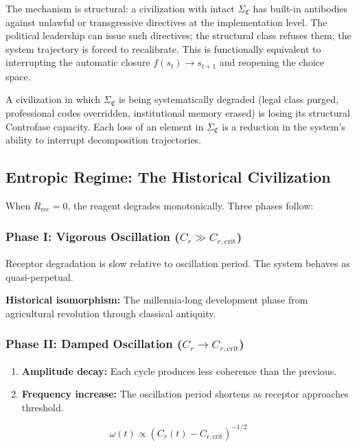 \documentclass[12pt,a4paper]{article}
\newcommand{\reag}{C_r}
\newcommand{\reagcrit}{C_{r,\mathrm{crit}}}
\newcommand{\SigmaCF}{\Sigma_{\mathfrak{C}}}  %
\begin{document}
The mechanism is structural: a civilization with intact $\SigmaCF$ has built-in antibodies against unlawful or transgressive directives at the implementation level. The political leadership can issue such directives; the structural class refuses them; the system trajectory is forced to recalibrate. This is functionally equivalent to interrupting the automatic closure $f(s_t) \to s_{t+1}$ and reopening the choice space.

A civilization in which $\SigmaCF$ is being systematically degraded (legal class purged, professional codes overridden, institutional memory erased) is losing its structural Controfase capacity. Each loss of an element in $\SigmaCF$ is a reduction in the system's ability to interrupt decomposition trajectories.

\subsection{Entropic Regime: The Historical Civilization}

When $R_{\mathrm{rec}} = 0$, the reagent degrades monotonically. Three phases follow:

\subsubsection{Phase I: Vigorous Oscillation ($\reag \gg \reagcrit$)}

Receptor degradation is slow relative to oscillation period. The system behaves as quasi-perpetual.

\textbf{Historical isomorphism:} The millennia-long development phase from agricultural revolution through classical antiquity.

\subsubsection{Phase II: Damped Oscillation ($\reag \to \reagcrit$)}

\begin{enumerate}[label=(\roman*)]
    \item \textbf{Amplitude decay:} Each cycle produces less coherence than the previous.
    \item \textbf{Frequency increase:} The oscillation period shortens as receptor approaches threshold.
\end{enumerate}

\begin{equation}\label{eq:freq_increase}
\omega(t) \propto (\reag(t) - \reagcrit)^{-1/2}
\end{equation}
\end{document}
